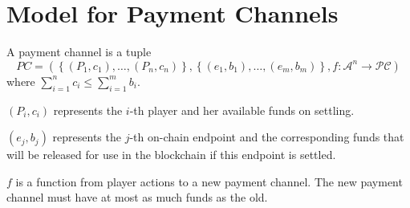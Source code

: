 \section{Model for Payment Channels}
  A payment channel is a tuple
  \begin{equation*}
    PC = \left(\left\{\left(P_1, c_1\right), \dots, \left(P_n, c_n\right)\right\},
    \left\{\left(e_1, b_1\right), \dots, \left(e_m, b_m\right)\right\}, f : \mathcal{A}^n
    \rightarrow \mathcal{PC}\right)
  \end{equation*}
  where $\sum\limits_{i = 1}^n c_i \leq \sum\limits_{i = 1}^m b_i$.

  $\left(P_i, c_i\right)$ represents the $i$-th player and her available funds on
  settling.

  $\left(e_j, b_j\right)$ represents the $j$-th on-chain endpoint and the corresponding
  funds that will be released for use in the blockchain if this endpoint is settled.

  $f$ is a function from player actions to a new payment channel. The new payment channel
  must have at most as much funds as the old.
